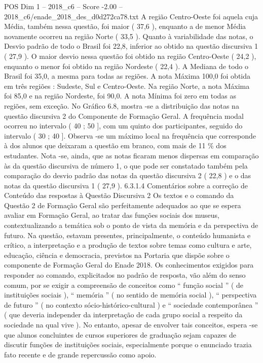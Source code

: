 \begin{textsample}{POS Dim 1 – 2018\_c6 – Score -2.00 – 2018\_c6/enade\_2018\_des\_d0d272ca78.txt}
A região Centro-Oeste foi aquela cuja Média, também nessa questão, foi maior ( 37,6 ), enquanto a de menor Média novamente ocorreu na região Norte ( 33,5 ).
Quanto à variabilidade das notas, o Desvio padrão de todo o Brasil foi 22,8, inferior ao obtido na questão discursiva 1 ( 27,9 ).
O maior desvio nessa questão foi obtido na região Centro-Oeste ( 24,2 ), enquanto o menor foi obtido na região Nordeste ( 22,4 ).
A Mediana de todo o Brasil foi 35,0, a mesma para todas as regiões.
A nota Máxima 100,0 foi obtida em três regiões : Sudeste, Sul e Centro-Oeste.
Na região Norte, a nota Máxima foi 85,0 e na região Nordeste, foi 90,0.
A nota Mínima foi zero em todas as regiões, sem exceção.
No Gráfico 6.8, mostra -se a distribuição das notas na questão discursiva 2 do Componente de Formação Geral.
A frequência modal ocorreu no intervalo ( 40 ; 50 ], com um quinto dos participantes, seguido do intervalo ( 30 ; 40 ].
Observa -se um máximo local na frequência que corresponde à dos alunos que deixaram a questão em branco, com mais de 11 \% dos estudantes.
Nota -se, ainda, que as notas ficaram menos dispersas em comparação às da questão discursiva de número 1, o que pode ser constatado também pela comparação do desvio padrão das notas da questão discursiva 2 ( 22,8 ) e o das notas da questão discursiva 1 ( 27,9 ). 6.3.1.4 Comentários sobre a correção de Conteúdo das respostas à Questão Discursiva 2 Os textos e o comando da Questão 2 de Formação Geral são perfeitamente adequados ao que se espera avaliar em Formação Geral, ao tratar das funções sociais dos museus, contextualizando a temática sob o ponto de vista da memória e da perspectiva de futuro.
Na questão, estavam presentes, principalmente, o conteúdo humanista e crítico, a interpretação e a produção de textos sobre temas como cultura e arte, educação, ciência e democracia, previstos na Portaria que dispõe sobre o componente de Formação Geral do Enade 2018.
Os conhecimentos exigidos para responder ao comando, explicitados no padrão de resposta, vão além do senso comum, por se exigir a compreensão de conceitos como “ função social ” ( de instituições sociais ), “ memória ” ( no sentido de memória social ), “ perspectiva de futuro ” ( no contexto sócio-histórico-cultural ) e “ sociedade contemporânea ” ( que deveria independer da interpretação de cada grupo social a respeito da sociedade na qual vive ).
No entanto, apesar de envolver tais conceitos, espera -se que alunos concluintes de cursos superiores de graduação sejam capazes de discutir funções de instituições sociais, especialmente porque o enunciado trazia fato recente e de grande repercussão como apoio.

\end{textsample}
